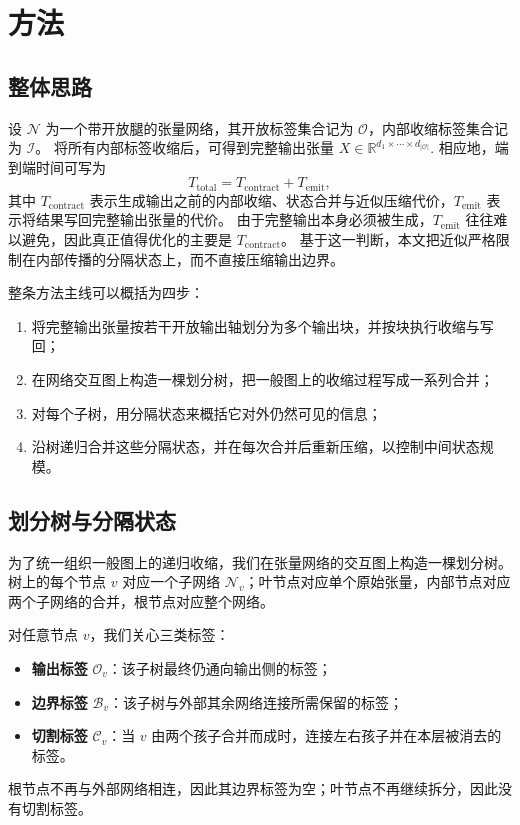 \section{方法}

\subsection{整体思路}
设 $\mathcal N$ 为一个带开放腿的张量网络，其开放标签集合记为 $\mathcal O$，内部收缩标签集合记为 $\mathcal I$。
将所有内部标签收缩后，可得到完整输出张量 $X \in \mathbb{R}^{d_1 \times \cdots \times d_{|\mathcal O|}}$.
相应地，端到端时间可写为
\[
T_{\mathrm{total}} = T_{\mathrm{contract}} + T_{\mathrm{emit}},
\]
其中 $T_{\mathrm{contract}}$ 表示生成输出之前的内部收缩、状态合并与近似压缩代价，$T_{\mathrm{emit}}$ 表示将结果写回完整输出张量的代价。
由于完整输出本身必须被生成，$T_{\mathrm{emit}}$ 往往难以避免，因此真正值得优化的主要是 $T_{\mathrm{contract}}$。
基于这一判断，本文把近似严格限制在内部传播的分隔状态上，而不直接压缩输出边界。

整条方法主线可以概括为四步：
\begin{enumerate}
    \item 将完整输出张量按若干开放输出轴划分为多个输出块，并按块执行收缩与写回；
    \item 在网络交互图上构造一棵划分树，把一般图上的收缩过程写成一系列合并；
    \item 对每个子树，用分隔状态来概括它对外仍然可见的信息；
    \item 沿树递归合并这些分隔状态，并在每次合并后重新压缩，以控制中间状态规模。
\end{enumerate}

\subsection{划分树与分隔状态}
为了统一组织一般图上的递归收缩，我们在张量网络的交互图上构造一棵划分树。
树上的每个节点 $v$ 对应一个子网络 $\mathcal N_v$；叶节点对应单个原始张量，内部节点对应两个子网络的合并，根节点对应整个网络。

对任意节点 $v$，我们关心三类标签：
\begin{itemize}
    \item \textbf{输出标签} $\mathcal O_v$：该子树最终仍通向输出侧的标签；
    \item \textbf{边界标签} $\mathcal B_v$：该子树与外部其余网络连接所需保留的标签；
    \item \textbf{切割标签} $\mathcal C_v$：当 $v$ 由两个孩子合并而成时，连接左右孩子并在本层被消去的标签。
\end{itemize}
根节点不再与外部网络相连，因此其边界标签为空；叶节点不再继续拆分，因此没有切割标签。

